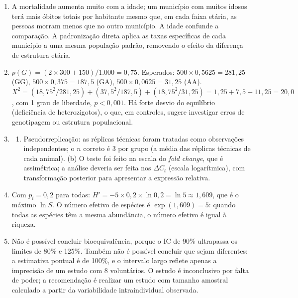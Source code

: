 \documentclass[
]{book}
\providecommand{\tightlist}{%
  \setlength{\itemsep}{0pt}\setlength{\parskip}{0pt}}
\begin{document}
\begin{enumerate}
\begin{verbatim}
##                medida  estimativa    inferior     superior
## 1      Risco relativo   0.6000000   0.3459974  1.040470185
## 2    Razão de chances   0.5604396   0.3012991  1.042460888
## 3 Diferença de riscos  -0.0600000  -0.1247020  0.004178594
## 4             NNT/NNH -16.6666667 239.3149571 -8.019115555
\end{verbatim}
\item
  A mortalidade aumenta muito com a idade; um município com muitos idosos terá mais óbitos totais por habitante mesmo que, em cada faixa etária, as pessoas morram menos que no outro município. A idade confunde a comparação. A padronização direta aplica as taxas específicas de cada município a uma mesma população padrão, removendo o efeito da diferença de estrutura etária.
\item
  \(p(G) = (2 \times 300 + 150)/1.000 = 0{,}75\). Esperados: \(500 \times 0{,}5625 = 281{,}25\) (GG), \(500 \times 0{,}375 = 187{,}5\) (GA), \(500 \times 0{,}0625 = 31{,}25\) (AA). \(X^2 = (18{,}75^2/281{,}25) + (37{,}5^2/187{,}5) + (18{,}75^2/31{,}25) = 1{,}25 + 7{,}5 + 11{,}25 = 20{,}0\), com 1 grau de liberdade, \(p < 0{,}001\). Há forte desvio do equilíbrio (deficiência de heterozigotos), o que, em controles, sugere investigar erros de genotipagem ou estrutura populacional.
\item
  \begin{enumerate}
  \def\labelenumii{(\alph{enumii})}
  \tightlist
  \item
    Pseudorreplicação: as réplicas técnicas foram tratadas como observações independentes; o \(n\) correto é 3 por grupo (a média das réplicas técnicas de cada animal). (b) O teste foi feito na escala do \emph{fold change}, que é assimétrica; a análise deveria ser feita nos \(\Delta C_t\) (escala logarítmica), com transformação posterior para apresentar a expressão relativa.
  \end{enumerate}
\item
  Com \(p_i = 0{,}2\) para todas: \(H' = -5 \times 0{,}2 \times \ln 0{,}2 = \ln 5 \approx 1{,}609\), que é o máximo \(\ln S\). O número efetivo de espécies é \(\exp(1{,}609) = 5\): quando todas as espécies têm a mesma abundância, o número efetivo é igual à riqueza.
\item
  Não é possível concluir bioequivalência, porque o IC de 90\% ultrapassa os limites de 80\% e 125\%. Também não é possível concluir que sejam diferentes: a estimativa pontual é de 100\%, e o intervalo largo reflete apenas a imprecisão de um estudo com 8 voluntários. O estudo é inconclusivo por falta de poder; a recomendação é realizar um estudo com tamanho amostral calculado a partir da variabilidade intraindividual observada.
\end{enumerate}
\end{document}
